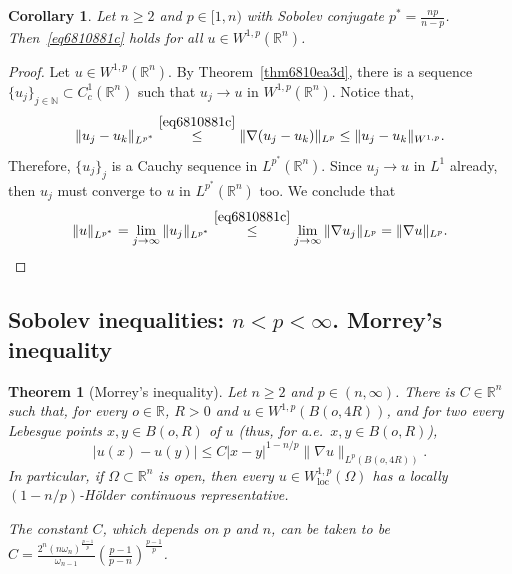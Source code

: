 \documentclass[a4paper,9pt]{amsart}
\newcommand{\N}{\mathbb{N}}	%
\newcommand{\R}{\mathbb{R}}	%
\newcommand{\loc}{\mathrm{loc}}
\newcommand{\grad}{\nabla}
\theoremstyle{plain}
\newtheorem{theorem}[proposition]{Theorem}
\newtheorem{corollary}[proposition]{Corollary}
\theoremstyle{definition}
\theoremstyle{remark}
\begin{document}
\begin{corollary}\label{cor681fa13d}
	Let $n\ge 2$ and $p\in[1,n)$ with Sobolev conjugate $p^* = \frac{np}{n-p}$.
	Then~\eqref{eq6810881c} holds for all $u\in W^{1,p}(\R^n)$.
\end{corollary}
\begin{proof}
	Let $u\in W^{1,p}(\R^n)$.
	By Theorem~\ref{thm6810ea3d}, there is a sequence $\{u_j\}_{j\in\N}\subset C^1_c(\R^n)$ such that $u_j\to u$ in $W^{1,p}(\R^n)$.
	Notice that, 
	\begin{equation}
		\|u_j-u_k\|_{L^{p^*}} 
		\overset{\eqref{eq6810881c}}\le \|\grad(u_j-u_k)\|_{L^p}
		\le \|u_j-u_k\|_{W^{1,p}} .
	\end{equation}
	Therefore, $\{u_j\}_j$ is a Cauchy sequence in $L^{p^*}(\R^n)$.
	Since $u_j\to u$ in $L^1$ already, then $u_j$ must converge to $u$ in $L^{p^*}(\R^n)$ too.
	We conclude that
	\begin{equation}
		\|u\|_{L^{p^*}} 
		= \lim_{j\to\infty} \|u_j\|_{L^{p^*}}
		\overset{\eqref{eq6810881c}}\le \lim_{j\to\infty} \|\grad u_j\|_{L^p}
		= \|\grad u\|_{L^p} .
	\end{equation}
\end{proof}

\subsection{Sobolev inequalities: $n < p < \infty$. Morrey's inequality}\label{subs6895bdab}

\begin{theorem}[Morrey's inequality]\label{thm681726ad}
	Let $n\ge2$ and $p\in(n,\infty)$.
	There is $C\in\R^n$ such that, for every $o\in\R$, $R>0$ and $u\in W^{1,p}(B(o,4R))$,
	and for two every Lebesgue points $x,y\in B(o,R)$ of $u$ (thus, for a.e.~$x,y\in B(o,R)$),
	\begin{equation}\label{eq68177bc8}
		|u(x)-u(y)| \le C |x-y|^{1-n/p} \|\grad u\|_{L^p(B(o,4R))} .
	\end{equation}
	In particular, if $\Omega\subset\R^n$ is open, then every $u\in W^{1,p}_\loc(\Omega)$ has a locally $(1-n/p)$-Hölder continuous representative.
	
	The constant $C$, which depends on $p$ and $n$, can be taken to be $C=\frac{ 2^n (n\omega_n)^{\frac{p-1}{p}} }{ \omega_{n-1} } \left(\frac{p-1}{p-n}\right)^{\frac{p-1}{p}}$.
\end{theorem}
\end{document}
